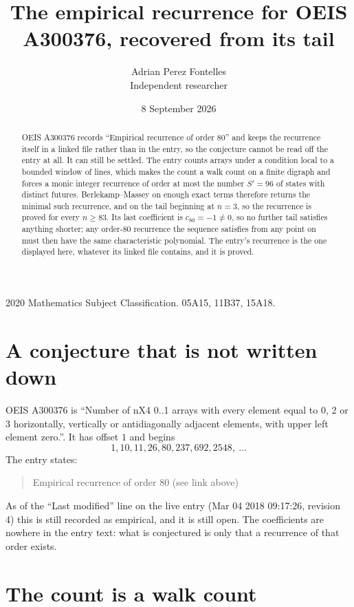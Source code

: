 \documentclass[11pt,a4paper]{article}
\title{The empirical recurrence for OEIS A300376, recovered from its tail}
\author{Adrian Perez Fontelles\\ \small Independent researcher}
\date{8 September 2026}
\theoremstyle{plain}
\theoremstyle{definition}
\begin{document}
\maketitle

\begin{abstract}
OEIS A300376 records ``Empirical recurrence of order $80$'' and keeps the recurrence itself in
a linked file rather than in the entry, so the conjecture cannot be read off the entry at all.
It can still be settled. The entry counts arrays under a condition local to a bounded window of
lines, which makes the count a walk count on a finite digraph and forces a monic integer
recurrence of order at most the number $S'=96$ of states with distinct futures. Berlekamp--Massey on
enough exact terms therefore returns the minimal such recurrence, and on the tail beginning at $n=3$, so the recurrence is proved for every $n\ge83$.
Its last coefficient is $c_{80}=-1\neq0$, so no further tail satisfies anything
shorter; any order-$80$ recurrence the sequence satisfies from any point on must then have
the same characteristic polynomial. The entry's recurrence is the one displayed here, whatever
its linked file contains, and it is proved.
\end{abstract}

\noindent\small 2020 Mathematics Subject Classification. 05A15, 11B37, 15A18.\normalsize

\section{A conjecture that is not written down}

OEIS A300376 is ``Number of nX4 0..1 arrays with every element equal to 0, 2 or 3 horizontally, vertically or antidiagonally adjacent elements, with upper left element zero.''. It has offset $1$ and begins
\[
1, 10, 11, 26, 80, 237, 692, 2548,\ \dots
\]
The entry states:
\begin{quote}
Empirical recurrence of order 80 (see link above)
\end{quote}
As of the ``Last modified'' line on the live entry (Mar 04 2018 09:17:26, revision 4)
this is still recorded as empirical, and it is still open. The coefficients are nowhere in the
entry text: what is conjectured is only that a recurrence of that order exists.

\section{The count is a walk count}
\end{document}
